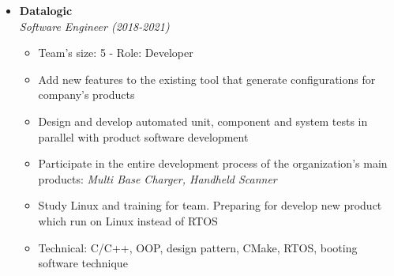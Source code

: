 \documentclass[10pt,oneside,a4paper]{article}
\begin{document}
\begin{tcolorbox}
\begin{minipage}[t]{11cm}
\begin{tcolorbox}[grow to right by=0.75cm,colback=white,colframe=white]
\begin{itemize}
{                }
                \item 
                {
                    \textbf{Datalogic} \\
                    \emph{Software Engineer (2018-2021)}
                    \begin{itemize}[label=$\circ$]
                        \item {Team's size: 5 - Role: Developer}
                        \item {Add new features to the existing tool that generate configurations for company's products}
                        \item {Design and develop automated unit, component and system tests in 
                        parallel with product software development}
                        \item {Participate in the entire development process of the organization's main products: 
                        \textit{Multi Base Charger, Handheld Scanner}}
                        \item {Study Linux and training for team. Preparing for develop new product which run on Linux instead of RTOS}
                        \item {Technical: C/C++, OOP, design pattern, CMake, RTOS, booting software technique}
                    \end{itemize}
                }
            \end{itemize}
        \end{tcolorbox}
    \end{minipage}

\end{tcolorbox}
\end{document}
